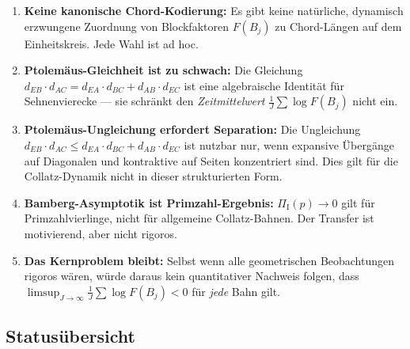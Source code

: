 \documentclass[12pt,a4paper]{article}
\newcommand{\Ptol}{\Pi}             %
\begin{document}
\begin{tcolorbox}[lücke, title={Grenzen des Ptolemäus-Ansatzes}]
\begin{enumerate}[label=\upshape(\alph*), leftmargin=*]
  \item \textbf{Keine kanonische Chord-Kodierung:}
    Es gibt keine natürliche, dynamisch erzwungene Zuordnung von Blockfaktoren
    $F(B_j)$ zu Chord-Längen auf dem Einheitskreis. Jede Wahl ist ad hoc.

  \item \textbf{Ptolemäus-Gleichheit ist zu schwach:}
    Die Gleichung $d_{EB}\cdot d_{AC} = d_{EA}\cdot d_{BC} + d_{AB}\cdot d_{EC}$
    ist eine algebraische Identität für Sehnenvierecke --- sie schränkt
    den \emph{Zeitmittelwert} $\frac{1}{J}\sum \log F(B_j)$ nicht ein.

  \item \textbf{Ptolemäus-Ungleichung erfordert Separation:}
    Die Ungleichung $d_{EB}\cdot d_{AC} \leq d_{EA}\cdot d_{BC} + d_{AB}\cdot d_{EC}$
    ist nutzbar nur, wenn expansive Übergänge auf Diagonalen und kontraktive
    auf Seiten konzentriert sind. Dies gilt für die Collatz-Dynamik nicht
    in dieser strukturierten Form.

  \item \textbf{Bamberg-Asymptotik ist Primzahl-Ergebnis:}
    $\Ptol_{\mathrm I}(p) \to 0$ gilt für Primzahlvierlinge, nicht für
    allgemeine Collatz-Bahnen. Der Transfer ist motivierend, aber nicht rigoros.

  \item \textbf{Das Kernproblem bleibt:}
    Selbst wenn alle geometrischen Beobachtungen rigoros wären, würde
    daraus kein quantitativer Nachweis folgen, dass $\limsup_{J\to\infty}
    \frac{1}{J}\sum \log F(B_j) < 0$ für \emph{jede} Bahn gilt.
\end{enumerate}
\end{tcolorbox}

\subsection{Statusübersicht}
\end{document}
